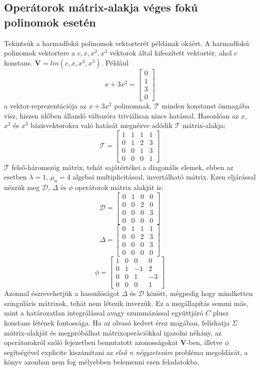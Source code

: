 \documentclass[14p]{article}
\begin{document}
\subsection{Operátorok mátrix-alakja véges fokú polinomok esetén}
Tekintsük a harmadfokú polinomok vektorterét példának okáért. A harmadfokú polinomok vektortere a $c, x, x^2, x^3$ vektorok által kifeszített vektortér, ahol $c$ konstans. $\mathbf{V} = lin(c, x, x^2, x^3)$. Például
\[
	x + 3x^2 = 
	\begin{bmatrix}
	0 \\
	1 \\
	3 \\
	0
	\end{bmatrix}
\]
a vektor-reprezentációja az $x + 3x^2$ polinomnak. $\mathcal{T}$ minden konstanst önmagába visz, hiszen időben állandó változóra triviálisan nincs hatással. Hasonlóan az $x$, $x^2$ és $x^3$ bázisvektorokra való hatását megnézve adódik $\mathcal{T}$ mátrix-alakja:
\[
	\mathcal{T} =
	\begin{bmatrix}
	1 & 1 & 1 & 1 \\
	0 & 1 & 2 & 3 \\
	0 & 0 & 1 & 3 \\
	0 & 0 & 0 & 1
	\end{bmatrix}
\] 
$\mathcal{T}$ felső-háromszög mátrix, tehát sajátértékei a diagonális elemek, ebben az esetben $\lambda = 1$, $\mu_a = 4$ algebai multiplicitással, invertálható mátrix. 
Ezen eljárással nézzük meg $\mathcal{D}$, $\Delta$ és $\phi$ operátorok mátrix alakját is:
\[
	\mathcal{D} = 
	\begin{bmatrix}
		0 & 1 & 0 & 0 \\
		0 & 0 & 2 & 0 \\
		0 & 0 & 0 & 3 \\
		0 & 0 & 0 & 0
	\end{bmatrix}
\]
\[
	\Delta = 
	\begin{bmatrix}
		0 & 1 & 1 & 1 \\
		0 & 0 & 2 & 3 \\
		0 & 0 & 0 & 3 \\
		0 & 0 & 0 & 0
	\end{bmatrix}
\]
\[
	\phi = 
	\begin{bmatrix}
		1 & 0 & 0 & 0 \\
		0 & 1 & -1 & 2 \\
		0 & 0 & 1 & -3 \\
		0 & 0 & 0 & 1
	\end{bmatrix}
\]
Azonnal észrevehetjük a hasonlóságot $\Delta$ és $\mathcal{D}$ között, mégpedig hogy mindketten szinguláris mátrixok, tehát nem létezik inverzük. Ez a megállapítás semmi más, mint a határozatlan integrálással avagy szummázással együttjáró $C$ plusz konstans létének fontossága. Ha az olvasó kedvet érez magában, felírhatja $\Sigma$ mátrix-alakját és megpróbálhat mátrixoperációkkal igazolni néhány, az operátorokról szóló fejezetben bemutatott azonosságokat $\mathbf{V}$-ben, illetve $\phi$ segítségével explicite kiszámítani az \emph{első n négyzetszám} probléma megoldását, a könyv azonban nem fog mélyebben belemenni ezen feladatokba.
\end{document}
